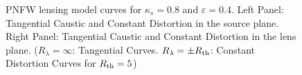 \begin{figure}[!ht]
\caption{\label{pnfw_curves_pm-3} PNFW lensing model curves for $\kappa_s=0.8$
and $\varepsilon=0.4$. Left Panel: Tangential Caustic and Constant
Distortion in the source plane. Right Panel: Tangential Caustic and Constant
Distortion in the lens plane. ($R_\lambda=\infty$: Tangential Curves.
$R_\lambda=\pm R_{\rm th}$: Constant Distortion Curves for $R_{\rm th}=5$)}
\end{figure}

